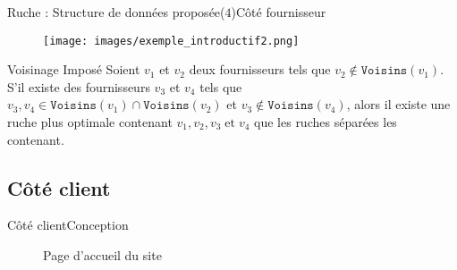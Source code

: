 \documentclass[usenames,dvipsnames]{beamer}
\begin{document}
\begin{frame}{Ruche : Structure de données proposée($4$)}{Côté fournisseur}
\begin{figure}[!ht]
  \centering
  \texttt{[image: images/exemple\_introductif2.png]}
\end{figure}

\begin{block}{Voisinage Imposé}
Soient $v_1$ et $v_2$ deux fournisseurs tels que $v_2 \notin \texttt{Voisins}(v_1)$. S'il existe des fournisseurs $v_3$ et $v_4$ tels que $v_3, v_4 \in \texttt{Voisins}(v_1) \cap \texttt{Voisins}(v_2)$ et $v_3 \notin \texttt{Voisins}(v_4)$, alors il existe une ruche plus optimale contenant $v_1, v_2, v_3\; \text{et}\; v_4$ que les ruches séparées les contenant.
\end{block}
\end{frame}

\subsection{Côté client}
\begin{frame}{Côté client}{Conception}
  \begin{figure}[!ht]
  \caption{Page d'accueil du site}
  \end{figure}
\end{frame}
\end{document}
